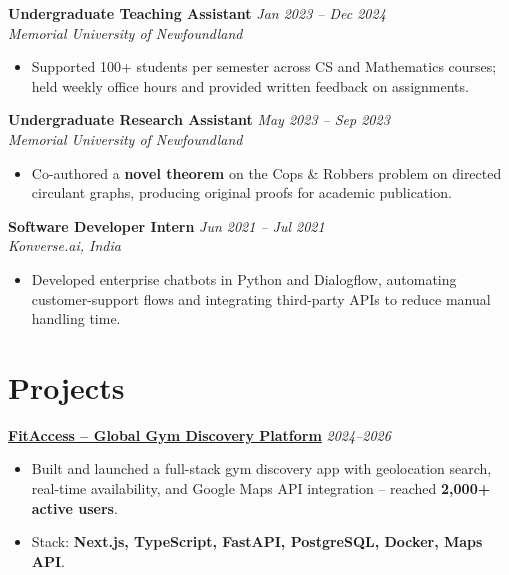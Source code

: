 \documentclass[a4paper,10pt]{article}
\begin{document}
\vspace{1pt}
\noindent\textbf{Undergraduate Teaching Assistant} \hfill \textit{\small Jan 2023 -- Dec 2024}\\
\textit{\small Memorial University of Newfoundland}
\begin{itemize}
  \item Supported 100+ students per semester across CS and Mathematics courses; held weekly office hours and provided written feedback on assignments.
\end{itemize}

\vspace{1pt}
\noindent\textbf{Undergraduate Research Assistant} \hfill \textit{\small May 2023 -- Sep 2023}\\
\textit{\small Memorial University of Newfoundland}
\begin{itemize}
  \item Co-authored a \textbf{novel theorem} on the Cops \& Robbers problem on directed circulant graphs, producing original proofs for academic publication.
\end{itemize}

\vspace{1pt}
\noindent\textbf{Software Developer Intern} \hfill \textit{\small Jun 2021 -- Jul 2021}\\
\textit{\small Konverse.ai, India}
\begin{itemize}
  \item Developed enterprise chatbots in Python and Dialogflow, automating customer-support flows and integrating third-party APIs to reduce manual handling time.
\end{itemize}

\section{Projects}

\noindent\href{https://fitaccess-global-hub-web-g8rq.vercel.app/}{\textbf{FitAccess -- Global Gym Discovery Platform}} \hfill \textit{\small 2024--2026}
\begin{itemize}
  \item Built and launched a full-stack gym discovery app with geolocation search, real-time availability, and Google Maps API integration -- reached \textbf{2,000+ active users}.
  \item Stack: \textbf{Next.js, TypeScript, FastAPI, PostgreSQL, Docker, Maps API}.
\end{itemize}
\end{document}
